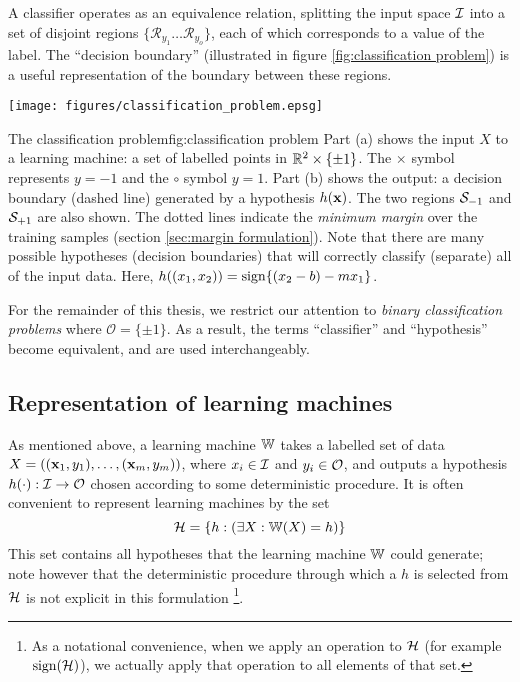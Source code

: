 A classifier operates as an equivalence relation, splitting the input
space $\mathcal{I}$ into a set of disjoint regions $\{ \mathcal{R}_{y_1}
\ldots \mathcal{R}_{y_o} \}$, each of which corresponds to a value of
the label.  The ``decision boundary'' (illustrated in figure
\ref{fig:classification problem}) is a useful representation of the
boundary between these regions.

\begin{linefigure}
\begin{center}
\texttt{[image: figures/classification\_problem.epsg]}
\end{center}
\begin{capt}{The classification problem}{fig:classification problem}
Part (a) shows the input $X$ to a learning machine: a set of
labelled points in $\mathbb{R}^2 \times \{ \pm 1 \}$.  The $\times$ symbol
represents $y=-1$ and the $\circ$ symbol $y=1$.  Part (b) shows the
output: a decision boundary (dashed line) generated by a hypothesis
$h(\mathbf{x})$.  The two regions $\mathcal{S}_{-1}$ and $\mathcal{S}_{+1}$ are also
shown.  The dotted lines indicate the \emph{minimum margin} over the
training samples (section \ref{sec:margin formulation}).  Note that
there are many possible hypotheses (decision boundaries) that will
correctly classify (separate) all of the input data.  Here, $h((x_1,
x_2)) = \mathrm{sign}\{ (x_2 - b) - m x_1 \}$.
\end{capt}
\end{linefigure}

For the remainder of this thesis, we restrict our attention to
\emph{binary classification problems} where $\mathcal{O} = \{\pm
1\}$.  As a result, the terms ``classifier'' and ``hypothesis'' become
equivalent, and are used interchangeably.


\subsection{Representation of learning machines}
\label{sec:representation of learning machines}

As mentioned above, a learning machine $\mathbb{W}$ takes a labelled set of
data $X = ((\mathbf{x}_1, y_1), \ldots, (\mathbf{x}_m, y_m))$, where $x_i \in
\mathcal{I}$ and $y_i \in \mathcal{O}$, and outputs a hypothesis $h(\cdot) : \mathcal{I}
\rightarrow \mathcal{O}$ chosen according to some deterministic procedure.
It is often convenient to represent learning machines by the set
%
\begin{equation}
\mathcal{H} = \{h : \left( \exists X : \mathbb{W}(X) = h \right) \}
\end{equation}
%
This set contains all hypotheses that the learning machine $\mathbb{W}$ could
generate; note however that the deterministic procedure through which
a $h$ is selected from $\mathcal{H}$ is not explicit in this formulation%
\footnote{As a notational convenience, when we apply an operation to
$\mathcal{H}$ (for example $\mathrm{sign}(\mathcal{H})$), we actually apply that operation
to all elements of that set.}.


